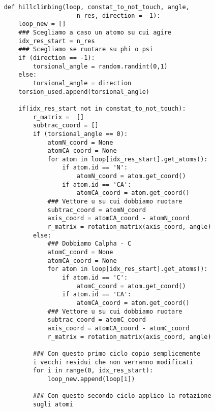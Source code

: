 \begin{verbatim}
    def hillclimbing(loop, constat_to_not_touch, angle, 
                        n_res, direction = -1):
        loop_new = []
        ### Scegliamo a caso un atomo su cui agire
        idx_res_start = n_res
        ### Scegliamo se ruotare su phi o psi
        if (direction == -1):
            torsional_angle = random.randint(0,1)
        else:
            torsional_angle = direction
        torsion_used.append(torsional_angle)

        if(idx_res_start not in constat_to_not_touch):
            r_matrix =  []
            subtrac_coord = []
            if (torsional_angle == 0):
                atomN_coord = None
                atomCA_coord = None
                for atom in loop[idx_res_start].get_atoms():
                    if atom.id == 'N':
                        atomN_coord = atom.get_coord()
                    if atom.id == 'CA':
                        atomCA_coord = atom.get_coord()
                ### Vettore u su cui dobbiamo ruotare
                subtrac_coord = atomN_coord
                axis_coord = atomCA_coord - atomN_coord
                r_matrix = rotation_matrix(axis_coord, angle)
            else:
                ### Dobbiamo Calpha - C
                atomC_coord = None
                atomCA_coord = None
                for atom in loop[idx_res_start].get_atoms():
                    if atom.id == 'C':
                        atomC_coord = atom.get_coord()
                    if atom.id == 'CA':
                        atomCA_coord = atom.get_coord()
                ### Vettore u su cui dobbiamo ruotare
                subtrac_coord = atomC_coord
                axis_coord = atomCA_coord - atomC_coord
                r_matrix = rotation_matrix(axis_coord, angle)
            
            ### Con questo primo ciclo copio semplicemente 
            i vecchi residui che non verranno modificati
            for i in range(0, idx_res_start):
                loop_new.append(loop[i])
        
            ### Con questo secondo ciclo applico la rotazione 
            sugli atomi
            

\end{verbatim}
